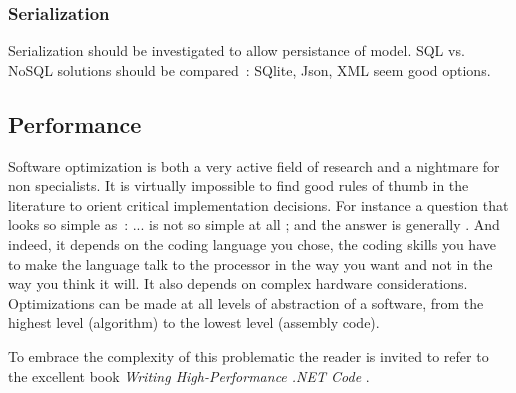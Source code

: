 \subsubsection{Serialization}
Serialization should be investigated to allow persistance of model. SQL vs. NoSQL solutions should be compared~: SQlite, Json, XML seem good options.

\subsection{Performance}
Software optimization is both a very active field of research and a nightmare for non specialists. It is virtually impossible to find good rules of thumb in the literature to orient critical implementation decisions. For instance a question that looks so simple as~:  ... is not so simple at all ; and the answer is generally . And indeed, it depends on the coding language you chose, the coding skills you have to make the language talk to the processor in the way you want and not in the way you think it will. It also depends on complex hardware considerations. Optimizations can be made at all levels of abstraction of a software, from the highest level (algorithm) to the lowest level (assembly code).

To embrace the complexity of this problematic the reader is invited to refer to the excellent book \emph{Writing High-Performance .NET Code} \cite{Watson2014}.


